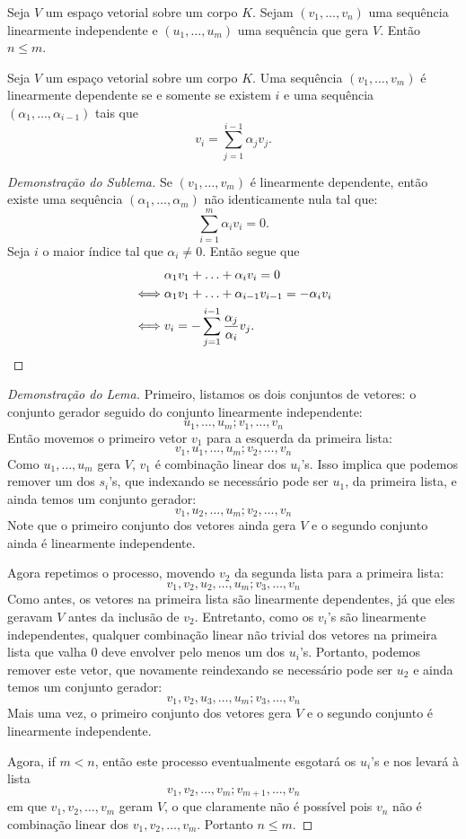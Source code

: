 \documentclass[11pt,twoside,a4paper]{book}
\begin{document}
\begin{lema}\label{basefin1} Seja $V$ um espaço vetorial sobre um corpo $K$.
Sejam $(v_1,\dots,v_n)$ uma sequência linearmente independente e
$(u_1,\dots,u_m)$ uma sequência que gera $V$. Então $n\leq m$.
\end{lema}

\begin{sublema} Seja $V$ um espaço vetorial sobre um corpo $K$.
Uma sequência $(v_1,\dots,v_m)$ é linearmente dependente se e somente se existem $i$ e uma sequência $(\alpha_1,\dots,\alpha_{i-1})$ tais que \[v_i=\sum\limits_{j=1}^{i-1}\alpha_jv_j.\]
\end{sublema}
\begin{proof}[Demonstração do Sublema]
Se $(v_1,\dots,v_m)$ é linearmente dependente, então existe uma sequência $(\alpha_1,\dots,\alpha_m)$ não identicamente nula tal que:
\[
\sum_{i=1}^m\alpha_iv_i=0.
\]
Seja $i$ o maior índice tal que $\alpha_i\neq 0$.
Então segue que
\begin{align*}
&\alpha_1 v_1 + \ldots + \alpha_i v_i = 0 \\ \iff & \alpha_1v_1 + \ldots + \alpha_{i-1} v_{i-1} = - \alpha_i v_i \\ \iff &
v_i= - \sum\limits_{j=1}^{i-1}\frac{\alpha_j}{\alpha_i}v_j.\qedhere
\end{align*}
\end{proof}

\begin{proof}[Demonstração do Lema]
Primeiro, listamos os dois conjuntos de vetores: o conjunto gerador seguido do conjunto linearmente independente:
\[
u_1,\dots,u_m;v_1,\dots,v_n
\]
Então movemos o primeiro vetor $v_1$ para a esquerda da primeira lista:
\[
v_1,u_1,\dots,u_m;v_2,\dots,v_n
\]
Como $u_1,\dots,u_m$ gera $V$, $v_1$ é combinação linear dos $u_i$'s. Isso implica que
podemos remover um dos $s_i$'s, que indexando se necessário pode ser $u_1$,
da primeira lista, e ainda temos um conjunto gerador:
\[
v_1,u_2,\dots,u_m;v_2,\dots,v_n
\]
Note que o primeiro conjunto dos vetores ainda gera $V$ e o segundo conjunto ainda é linearmente
independente.

\medskip
\noindent
Agora repetimos o processo, movendo $v_2$ da segunda lista para a primeira lista:
\[
v_1,v_2,u_2,\dots,u_m;v_3,\dots,v_n
\]
Como antes, os vetores na primeira lista são linearmente dependentes, já que eles geravam
$V$ antes da inclusão de $v_2$. Entretanto, como os $v_i$'s são linearmente independentes,
qualquer combinação linear não trivial dos vetores na primeira lista que valha $0$
deve envolver pelo menos um dos $u_i$'s. Portanto, podemos remover este vetor, que
novamente reindexando se necessário pode ser $u_2$ e ainda temos um conjunto gerador:
\[
v_1,v_2,u_3,\dots,u_m;v_3,\dots,v_n
\]
Mais uma vez, o primeiro conjunto dos vetores gera $V$ e o segundo conjunto é linearmente
independente.

\medskip
\noindent
Agora, if $m<n$, então este processo eventualmente esgotará os $u_i$'s e nos levará à lista
\[
v_1,v_2,\dots,v_m;v_{m+1},\dots,v_n
\]
em que $v_1,v_2,\dots,v_m$ geram $V$, o que claramente não é possível pois $v_n$ não é combinação linear
dos $v_1,v_2,\dots,v_m$. Portanto $n\leq m$.
\end{proof}
\end{document}
